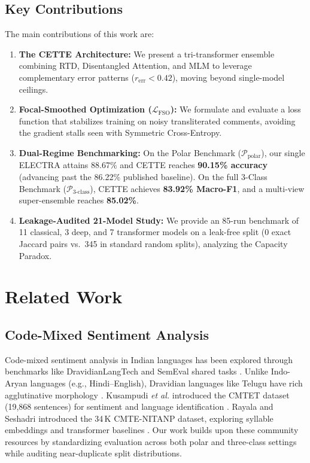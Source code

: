\documentclass[10pt,conference]{IEEEtran}
\begin{document}
\subsection{Key Contributions}
The main contributions of this work are:
\begin{enumerate}
    \item \textbf{The CETTE Architecture:} We present a tri-transformer ensemble combining RTD, Disentangled Attention, and MLM to leverage complementary error patterns ($r_{\text{err}} < 0.42$), moving beyond single-model ceilings.
    \item \textbf{Focal-Smoothed Optimization ($\mathcal{L}_{\text{FSO}}$):} We formulate and evaluate a loss function that stabilizes training on noisy transliterated comments, avoiding the gradient stalls seen with Symmetric Cross-Entropy.
    \item \textbf{Dual-Regime Benchmarking:} On the Polar Benchmark ($\mathcal{P}_{\text{polar}}$), our single ELECTRA attains 88.67\% and CETTE reaches \textbf{90.15\% accuracy} (advancing past the 86.22\% published baseline). On the full 3-Class Benchmark ($\mathcal{P}_{\text{3-class}}$), CETTE achieves \textbf{83.92\% Macro-F1}, and a multi-view super-ensemble reaches \textbf{85.02\%}.
    \item \textbf{Leakage-Audited 21-Model Study:} We provide an 85-run benchmark of 11 classical, 3 deep, and 7 transformer models on a leak-free split (0 exact Jaccard pairs vs.\ 345 in standard random splits), analyzing the Capacity Paradox.
\end{enumerate}

\section{Related Work}
\subsection{Code-Mixed Sentiment Analysis}
Code-mixed sentiment analysis in Indian languages has been explored through benchmarks like DravidianLangTech and SemEval shared tasks \cite{patwa2020, chakravarthi2022}. Unlike Indo-Aryan languages (e.g., Hindi--English), Dravidian languages like Telugu have rich agglutinative morphology \cite{kusampudi2021}. Kusampudi \emph{et al.} introduced the CMTET dataset (19,868 sentences) for sentiment and language identification \cite{kusampudi2021}. Rayala and Seshadri introduced the 34\,K CMTE-NITANP dataset, exploring syllable embeddings \cite{rayala2023} and transformer baselines \cite{rayala2026}. Our work builds upon these community resources by standardizing evaluation across both polar and three-class settings while auditing near-duplicate split distributions.
\end{document}
